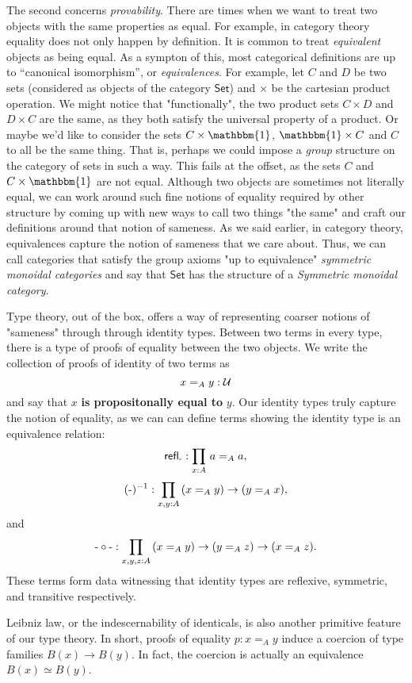 \documentclass[main.tex]{subfiles}
\begin{document}
The second concerns \textit{provability}. There are times when we want to treat two objects with the same properties as equal. For example, in category theory equality does not only happen by definition. It is common to treat \textit{equivalent} objects as being equal. As a sympton of this, most categorical definitions are up to ``canonical isomorphism'', or \textit{equivalences}. For example, let $C$ and $D$ be two sets (considered as objects of the category $\mathsf{Set}$) and $\times$ be the cartesian product operation. We might notice that "functionally", the two product sets $C \times D$ and $D \times C$ are the same, as they both satisfy the universal property of a product. Or maybe we'd like to consider the sets $C\times \mathbbm{1}$, $\mathbbm{1}\times C$ and $C$ to all be the same thing. That is, perhaps we could impose a \textit{group} structure on the category of sets in such a way. This fails at the offset, as the sets $C$ and $C\times \mathbbm{1}$ are not equal. Although two objects are sometimes not literally equal, we can work around such fine notions of equality required by other structure by coming up with new ways to call two things "the same" and craft our definitions around that notion of sameness. As we said earlier, in category theory, equivalences capture the notion of sameness that we care about. Thus, we can call categories that satisfy the group axioms "up to equivalence" \textit{symmetric monoidal categories} and say that $\mathsf{Set}$ has the structure of a \textit{Symmetric monoidal category}. 

Type theory, out of the box, offers a way of representing coarser notions of "sameness" through through identity types. Between two terms in every type, there is a type of proofs of equality between the two objects. We write the collection of proofs of identity of two terms as \[x=_A y : \mathcal{U}\]
and say that $x$ \textbf{is propositonally equal to} $y$. Our identity types truly capture the notion of equality, as we can can define terms showing the identity type is an equivalence relation:
 $$\refl{\text-} : \prd{x:A}a=_A a,$$ $$(\text-)^{-1}:\prd{x,y:A}(x =_A y ) \to (y =_A x),$$ and  $$\text-\circ\text- : \prd{x,y,z : A} (x =_A y) \to (y =_A z) \to (x =_A z).$$
These terms form data witnessing that identity types are reflexive, symmetric, and transitive respectively.

Leibniz law, or the indescernability of identicals, is also another primitive feature of our type theory. In short, proofs of equality $p : x =_A y$ induce a coercion of type families $B(x) \to B(y)$. In fact, the coercion is actually an equivalence $B(x) \simeq B(y)$. 
\end{document}
